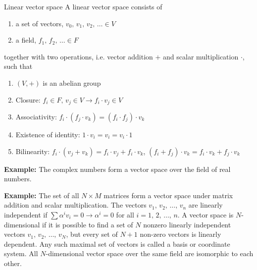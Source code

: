 \documentclass{beamer}
\begin{document}
\begin{frame}{Linear vector space}
\justify
A linear vector space consists of
\begin{enumerate}
\item[A] a set of vectors, $v_0,\, v_1,\, v_2,\, \ldots \in V$
\item[B] a field, $f_1,\, f_2,\, \ldots \in F$
\end{enumerate}
together with two operations, i.e. vector addition $+$ and scalar multiplication $\cdot$, such that
\begin{enumerate}
\item[1] $(V,+)$ is an abelian group
\item[2] Closure: $f_i\in F,\, v_j\in V \rightarrow f_i \cdot v_j \in V$
\item[3] Associativity: $f_i \cdot (f_j \cdot v_k) = (f_i \cdot f_j) \cdot v_k$
\item[4] Existence of identity: $1 \cdot v_i = v_i = v_i \cdot 1$
\item[5] Bilinearity: $f_i \cdot (v_j + v_k) = f_i \cdot v_j + f_i \cdot v_k$, $(f_i + f_j) \cdot v_k = f_i \cdot v_k + f_j \cdot v_k$
\end{enumerate}
\vfill
\textbf{Example:} The complex numbers form a vector space over the field of real numbers.
\end{frame}

\begin{frame}
\justify
\textbf{Example:} The set of all $N\times M$ matrices form a vector space under matrix addition and scalar multiplication.
\vfill
The vectors $v_1,\, v_2,\, \ldots,\, v_n$ are linearly independent if $\sum \alpha^i v_i = 0 \rightarrow \alpha^i = 0$ for all $i = 1,\, 2,\, \ldots,\, n$.
\vfill
A vector space is $N$-dimensional if it is possible to find a set of $N$ nonzero linearly independent vectors $v_1,\, v_2,\, \ldots,\, v_N$, but every set of $N+1$ non-zero vectors is linearly dependent.
\vfill
Any such maximal set of vectors is called a basis or coordinate system.
\vfill
All $N$-dimensional vector space over the same field are isomorphic to each other.
\end{frame}
\end{document}
